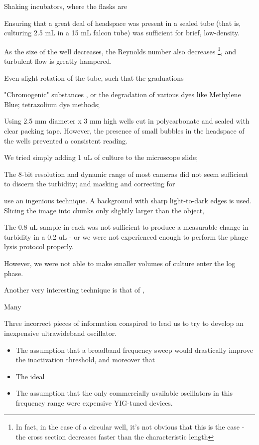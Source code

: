 \documentclass[paper.tex]{subfiles}
\begin{document}
Shaking incubators, where the flasks are 

Ensuring that a great deal of headspace was present in a sealed tube (that is, culturing 2.5 mL in a 15 mL falcon tube) was sufficient for brief, low-density.



As the size of the well decreases, the Reynolds number also decreases \footnote{In fact, in the case of a circular well, it's not obvious that this is the case - the cross section decreases faster than the characteristic length}, and turbulent flow is greatly hampered.

Even slight rotation of the tube, such that the graduations 

"Chromogenic" substances \cite{Fluorogenic1991}, or the degradation of various dyes like Methylene Blue; tetrazolium dye methods;

Using 2.5 mm diameter x 3 mm high wells cut in polycarbonate and sealed with clear packing tape. However, the presence of small bubbles in the headspace of the wells prevented a consistent reading.

We tried simply adding 1 uL of culture to the microscope slide;

The 8-bit resolution and dynamic range of most cameras did not seem sufficient to discern the turbidity; and masking and correcting for 

\cite{Vision2016} use an ingenious technique. A background with sharp light-to-dark edges is used. Slicing the image into chunks only slightly larger than the object,


The 0.8 uL sample in each was not sufficient to produce a measurable change in turbidity in a 0.2 uL - or we were not experienced enough to perform the phage lysis protocol properly.

However, we were not able to make smaller volumes of culture enter the log phase.




Another very interesting technique is that of \cite{Study2003}, 




Many 

Three incorrect pieces of information conspired to lead us to try to develop an inexpensive ultrawideband oscillator.

\begin{itemize}
	\item The assumption that a broadband frequency sweep would drastically improve the inactivation threshold, and moreover that 
	\item The ideal 
	\item The assumption that the only commercially available oscillators in this frequency range were expensive YIG-tuned devices.
\end{itemize}
\end{document}
